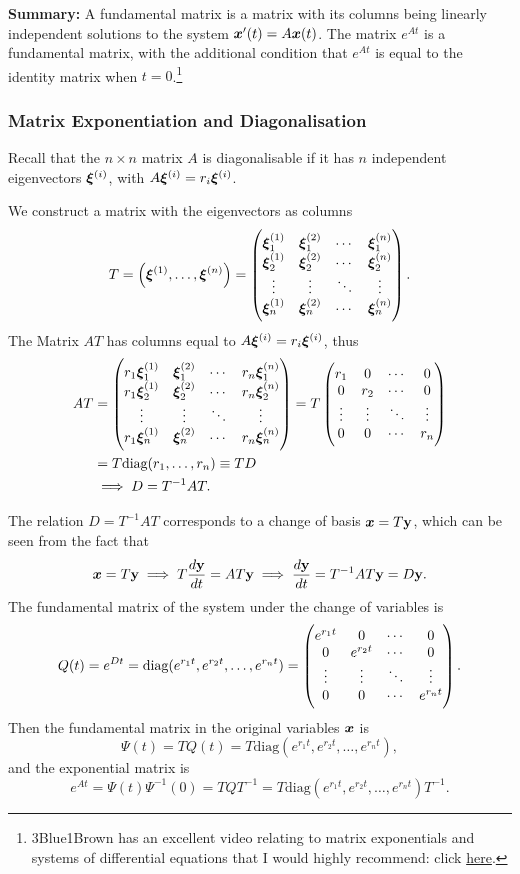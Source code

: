 \textbf{Summary:} A fundamental matrix is a matrix with its columns being linearly independent solutions to the system $\bm{x}'(t) = A\bm{x}(t)$. The matrix $e^{At}$ is a fundamental matrix, with the additional condition that $e^{At}$ is equal to the identity matrix when $t=0$.\footnote{3Blue1Brown has an excellent video relating to matrix exponentials and systems of differential equations that I would highly recommend: click \href{https://www.youtube.com/watch?v=O85OWBJ2ayo}{here}.}

\subsubsection{Matrix Exponentiation and Diagonalisation}\label{sec:diag}

Recall that the $n \times n$ matrix $A$ is diagonalisable if it has $n$ independent eigenvectors $\bm{\xi}^{(i)}$, with $A \bm{\xi}^{(i)} = r_i \bm{\xi}^{(i)}$.

We construct a matrix with the eigenvectors as columns
\[
	T = \left(\bm{\xi} ^{(1)}, \ldots, \bm{\xi} ^{(n)}\right) = \begin{pmatrix}\bm{\xi}_1^{(1)} & \bm{\xi}_1^{(2)} & \cdots & \bm{\xi}_1^{(n)} \\ \bm{\xi}_2^{(1)} & \bm{\xi}_2^{(2)} & \cdots & \bm{\xi}_2^{(n)} \\ \vdots & \vdots & \ddots & \vdots \\ \bm{\xi}_n^{(1)} & \bm{\xi}_n^{(2)} & \cdots & \bm{\xi}_n^{(n)}\end{pmatrix}.
\]
The Matrix $AT$ has columns equal to $A \bm{\xi}^{(i)} = r_i \bm{\xi}^{(i)}$, thus
\begin{align*}
	AT &= \begin{pmatrix}r_1\bm{\xi}_1^{(1)} & \bm{\xi}_1^{(2)} & \cdots & r_n\bm{\xi}_1^{(n)} \\ r_1\bm{\xi}_2^{(1)} & \bm{\xi}_2^{(2)} & \cdots & r_n\bm{\xi}_2^{(n)} \\ \vdots & \vdots & \ddots & \vdots \\ r_1\bm{\xi}_n^{(1)} & \bm{\xi}_n^{(2)} & \cdots & r_n\bm{\xi}_n^{(n)}\end{pmatrix} = T \begin{pmatrix}r_1 & 0 & \cdots & 0 \\ 0 & r_2 & \cdots & 0 \\ \vdots & \vdots & \ddots & \vdots \\ 0 & 0 & \cdots & r_n\end{pmatrix} \\
	&= T \text{diag}(r_1, \ldots, r_n) \equiv TD \\
	&\implies D = T^{-1}AT.
\end{align*}

The relation $D = T^{-1}AT$ corresponds to a change of basis $\bm{x} = T\textbf{y}$, which can be seen from the fact that
\[
	\bm{x} = T\textbf{y} \implies T \frac{d\textbf{y}}{dt} = AT\textbf{y} \implies \frac{d\textbf{y}}{dt} = T^{-1}AT \textbf{y} = D\textbf{y}.
\]
The fundamental matrix of the system under the change of variables is
\[
	Q(t) = e^{Dt} = \text{diag}(e^{r_1t}, e^{r_2t}, \ldots, e^{r_nt}) = \begin{pmatrix}e^{r_1t} & 0 & \cdots & 0 \\ 0 & e^{r_2t} & \cdots & 0 \\ \vdots & \vdots & \ddots & \vdots \\ 0 & 0 & \cdots & e^{r_nt}\end{pmatrix}.
\]
Then the fundamental matrix in the original variables $\bm{x}$ is
\[
	\Psi(t) = TQ(t) = T \text{diag}(e^{r_1t}, e^{r_2t}, \ldots, e^{r_nt}),
\]
and the exponential matrix is
\[
	e^{At} = \Psi(t) \Psi^{-1}(0) = TQT^{-1} = T \text{diag}(e^{r_1t}, e^{r_2t}, \ldots, e^{r_nt}) T^{-1}.
\]

